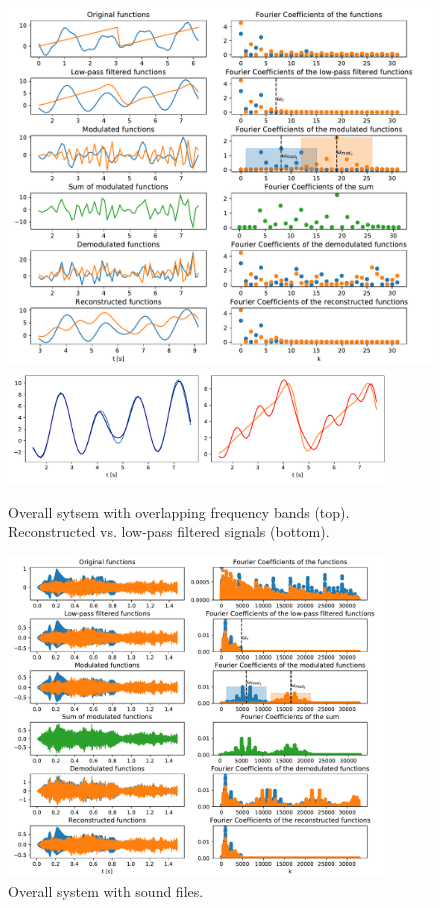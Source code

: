 \documentclass[12pt, a4paper]{report}
\begin{document}
\begin{figure}[h!]
	\centering
	\includegraphics[width=\textwidth]{figures/overall_overlapping.pdf}
	\includegraphics[width=0.9\textwidth]{figures/overlapping_cmp.pdf}
	\caption{Overall sytsem with overlapping frequency bands (top). Reconstructed vs. low-pass filtered signals (bottom).}
	\label{fig:overlap}
\end{figure}

\begin{figure}[h!]
	\centering
	\includegraphics[width=0.9\textwidth]{figures/overall_soundfile.pdf}
	\caption{Overall system with sound files.}
	\label{fig:soundfiles}
\end{figure}
\end{document}

